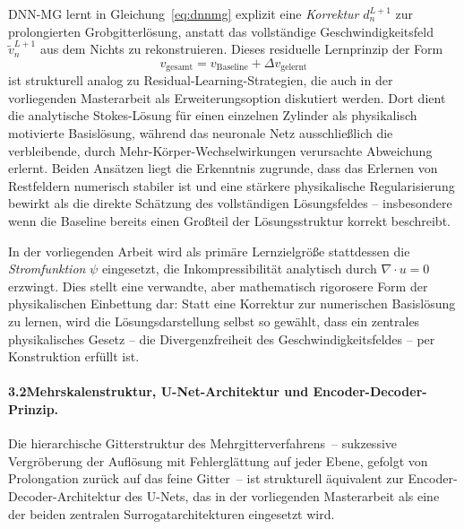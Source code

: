 \documentclass[a4paper,12pt]{article}
\begin{document}
DNN-MG lernt in Gleichung~\eqref{eq:dnnmg} explizit eine
\emph{Korrektur} $d^{L+1}_n$ zur prolongierten Grobgitterlösung,
anstatt das vollständige Geschwindigkeitsfeld $\tilde{v}^{L+1}_n$
aus dem Nichts zu rekonstruieren.
Dieses residuelle Lernprinzip der Form
\begin{equation}
    v_\text{gesamt} = v_\text{Baseline} + \Delta v_\text{gelernt}
\end{equation}
ist strukturell analog zu Residual-Learning-Strategien, die auch in der
vorliegenden Masterarbeit als Erweiterungsoption diskutiert werden.
Dort dient die analytische Stokes-Lösung für einen einzelnen Zylinder
als physikalisch motivierte Basislösung, während das neuronale Netz
ausschließlich die verbleibende, durch Mehr-Körper-Wechselwirkungen
verursachte Abweichung erlernt. Beiden Ansätzen liegt die Erkenntnis
zugrunde, dass das Erlernen von Restfeldern numerisch stabiler ist
und eine stärkere physikalische Regularisierung bewirkt als die direkte
Schätzung des vollständigen Lösungsfeldes -- insbesondere wenn die Baseline
bereits einen Großteil der Lösungsstruktur korrekt beschreibt.

In der vorliegenden Arbeit wird als primäre Lernzielgröße stattdessen
die \emph{Stromfunktion} $\psi$ eingesetzt, die Inkompressibilität
analytisch durch $\nabla \cdot u = 0$ erzwingt. Dies stellt eine
verwandte, aber mathematisch rigorosere Form der physikalischen
Einbettung dar: Statt eine Korrektur zur numerischen Basislösung zu lernen,
wird die Lösungsdarstellung selbst so gewählt, dass ein zentrales physikalisches
Gesetz -- die Divergenzfreiheit des Geschwindigkeitsfeldes -- per Konstruktion
erfüllt ist.

\paragraph{3.2\quad Mehrskalenstruktur, U-Net-Architektur und Encoder-Decoder-Prinzip.}

Die hierarchische Gitterstruktur des Mehrgitterverfahrens~-- sukzessive
Vergröberung der Auflösung mit Fehlerglättung auf jeder Ebene, gefolgt von
Prolongation zurück auf das feine Gitter~-- ist strukturell äquivalent zur
Encoder-Decoder-Architektur des U-Nets, das in der vorliegenden Masterarbeit
als eine der beiden zentralen Surrogatarchitekturen eingesetzt wird.
\end{document}
